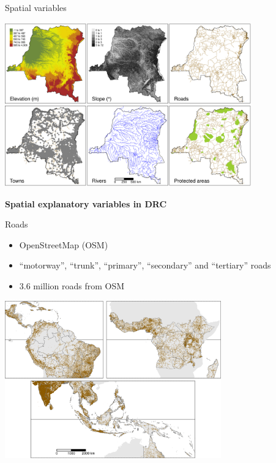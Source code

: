 \documentclass[10pt,table,dvipsnames,compress]{beamer}
\begin{document}
\begin{frame}[label={sec:orgfdeaa52}]{Spatial variables}
\begin{center}
\includegraphics[width=0.8\textwidth]{figs/sm/var.png}
\end{center}

\centering \textbf{Spatial explanatory variables in DRC}
\end{frame}

\begin{frame}[label={sec:orgbad9b56}]{Roads}
\begin{itemize}
\item OpenStreetMap (OSM)
\item ``motorway'', ``trunk'', ``primary'', ``secondary'' and ``tertiary'' roads
\item 3.6 million roads from OSM
\end{itemize}

\begin{center}
\includegraphics[width=0.7\textwidth]{figs/sm/roads.png}
\end{center}
\end{frame}
\end{document}
